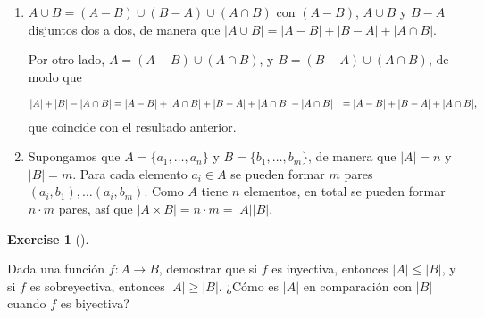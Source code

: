 \documentclass[
  letterpaper,
  DIV=11,
  numbers=noendperiod]{scrreport}
\theoremstyle{definition}
\newtheorem{exercise}{Exercise}[chapter]
\theoremstyle{remark}
\begin{document}
\begin{tcolorbox}[enhanced jigsaw, bottomtitle=1mm, opacityback=0, coltitle=black, toprule=.15mm, colback=white, titlerule=0mm, rightrule=.15mm, title=\textcolor{quarto-callout-tip-color}{\faLightbulb}\hspace{0.5em}{Solución}, breakable, bottomrule=.15mm, colbacktitle=quarto-callout-tip-color!10!white, toptitle=1mm, opacitybacktitle=0.6, left=2mm, leftrule=.75mm, colframe=quarto-callout-tip-color-frame, arc=.35mm]

\begin{enumerate}
\def\labelenumi{\alph{enumi}.}
\item
  \(A\cup B = (A-B) \cup (B-A)\cup (A\cap B)\) con \((A-B)\),
  \(A\cup B\) y \(B-A\) disjuntos dos a dos, de manera que
  \(|A\cup B| = |A-B| + |B-A| + |A\cap B|\).

  Por otro lado, \(A=(A-B)\cup (A\cap B)\), y \(B=(B-A)\cup (A\cap B)\),
  de modo que

  \[
   \begin{aligned}
   |A| + |B| - |A\cap B| &= |A-B| + |A\cap B| + |B-A| + |A\cap B| - |A\cap B| \newline
   &= |A-B| + |B-A| + |A\cap B|,
   \end{aligned}
   \] que coincide con el resultado anterior.
\item
  Supongamos que \(A=\{a_1,\ldots, a_n\}\) y \(B=\{b_1,\ldots, b_m\}\),
  de manera que \(|A|=n\) y \(|B|=m\). Para cada elemento \(a_i\in A\)
  se pueden formar \(m\) pares \((a_i,b_1),\ldots (a_i,b_m)\). Como
  \(A\) tiene \(n\) elementos, en total se pueden formar \(n\cdot m\)
  pares, así que \(|A\times B| = n\cdot m = |A||B|\).
\end{enumerate}

\end{tcolorbox}

\leavevmode{}%
\begin{exercise}[]\label{exr-12}

Dada una función \(f:A\rightarrow B\), demostrar que si \(f\) es
inyectiva, entonces \(|A|\leq |B|\), y si \(f\) es sobreyectiva,
entonces \(|A|\geq |B|\). ¿Cómo es \(|A|\) en comparación con \(|B|\)
cuando \(f\) es biyectiva?

\end{exercise}
\end{document}
